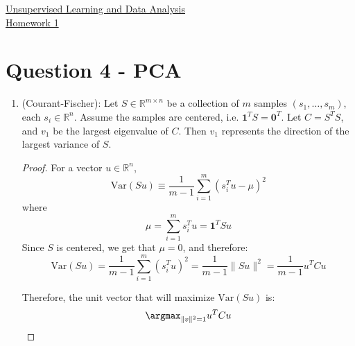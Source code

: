 \documentclass{article}
\begin{document}
\begin{center}
  {\huge \underline{Unsupervised Learning and Data Analysis} \\[5pt] \ul{Homework 1}}
\end{center}
\section*{Question 4 - PCA}
\begin{enumerate}[label=\textbf{\large\arabic*)}]

  \item 
\begin{claim}
(Courant-Fischer): Let $S \in \mathbb{R}^{m \times n}$ be a collection of $m$ samples $(s_1, \ldots, s_m)$, each $s_i \in \mathbb{R}^{n}$. 
  Assume the samples are centered, i.e. $\bm{1}^{T} S = \bm{0}^{T}$.  
Let $C = S ^{T}S$, and $v_1$ be the largest eigenvalue of $C$. Then $v_1$ represents the direction of the largest variance of $S$. 
\end{claim}

\begin{proof} For a vector $u \in \mathbb{R}^{n}$, 
\[
  \text{Var}(Su) \equiv \frac{1}{m-1} \sum_{i=1}^{m} (s_i ^{T} u- \mu) ^2
\]
    where
    \[
      \mu = \sum_{i=1}^{m} s_i ^{T} u = \bm{1}^{T}Su
    \]
   Since $S$ is centered, we get that $\mu=0$, and therefore:
    \[
      \text{Var}(Su) = \frac{1}{m-1} \sum_{i=1}^{m} (s_i ^{T} u) ^2 = \frac{1}{m-1} \lVert Su \rVert ^2 = \frac{1}{m-1} u ^{T} C u
    \]
    

    Therefore, the unit vector that will maximize $\text{Var}(Su)$ is: 
    \[
      \argmax_{\lVert v \rVert ^2 =1} u^{T} C u
    \]
    


\end{proof}
\end{enumerate}
\end{document}
